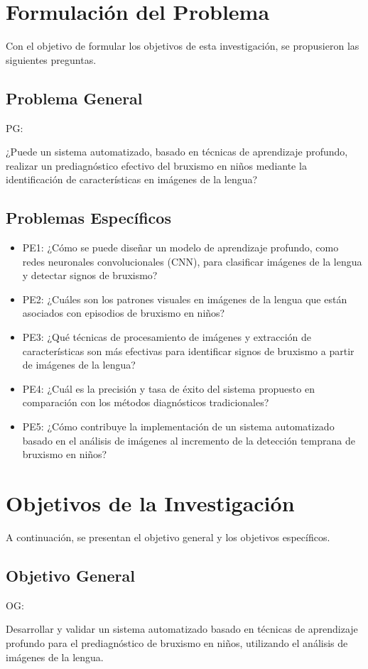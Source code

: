 \section{Formulación del Problema}
Con el objetivo de formular los objetivos de esta investigación, se propusieron las siguientes preguntas.
\subsection{Problema General}
PG: \newcommand{\ProblemaGeneral}{
	¿Puede un sistema automatizado, basado en técnicas de aprendizaje profundo, realizar un prediagnóstico efectivo del bruxismo en niños mediante la identificación de características en imágenes de la lengua?
}
\ProblemaGeneral
\subsection{Problemas Específicos}
\newcommand{\Pbone}{
	¿Cómo se puede diseñar un modelo de aprendizaje profundo, como redes neuronales convolucionales (CNN), para clasificar imágenes de la lengua y detectar signos de bruxismo?
	}
\newcommand{\Pbtwo}{
	¿Cuáles son los patrones visuales en imágenes de la lengua que están asociados con episodios de bruxismo en niños?
	}
\newcommand{\Pbthree}{
	¿Qué técnicas de procesamiento de imágenes y extracción de características son más efectivas para identificar signos de bruxismo a partir de imágenes de la lengua?
	}
\newcommand{\Pbfour}{
	¿Cuál es la precisión y tasa de éxito del sistema propuesto en comparación con los métodos diagnósticos tradicionales?
	}
\newcommand{\Pbfive}{
	¿Cómo contribuye la implementación de un sistema automatizado basado en el análisis de imágenes al incremento de la detección temprana de bruxismo en niños?
}

\begin{itemize}
	\item PE1: {\Pbone}
	\item PE2: {\Pbtwo}
	\item PE3: {\Pbthree}
	\item PE4: {\Pbfour}
	\item PE5: {\Pbfive}
\end{itemize}

\section{Objetivos de la Investigación}
A continuación, se presentan el objetivo general y los objetivos específicos.
\subsection{Objetivo General}
OG: \newcommand{\ObjetivoGeneral}{
	Desarrollar y validar un sistema automatizado basado en técnicas de aprendizaje profundo para el prediagnóstico de bruxismo en niños, utilizando el análisis de imágenes de la lengua.
	}
\ObjetivoGeneral
